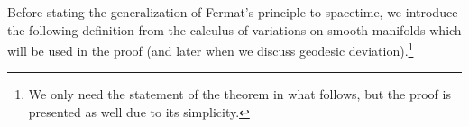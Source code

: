 %
%
%
%
Before stating the generalization of Fermat's principle to spacetime, we introduce the following definition from the calculus of variations on smooth manifolds which will be used in the proof (and later when we discuss geodesic deviation).\footnote{We only need the statement of the theorem in what follows, but the proof is presented as well due to its simplicity.}
